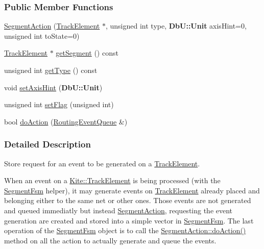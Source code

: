 \subsubsection*{Public Member Functions}
\begin{DoxyCompactItemize}
\item 
\hyperlink{classKite_1_1SegmentAction_acbeca58f8327b69a540628f299d5bd35}{Segment\-Action} (\hyperlink{classKite_1_1TrackElement}{Track\-Element} $\ast$, unsigned int type, {\bf Db\-U\-::\-Unit} axis\-Hint=0, unsigned int to\-State=0)
\item 
\hyperlink{classKite_1_1TrackElement}{Track\-Element} $\ast$ \hyperlink{classKite_1_1SegmentAction_ad2d369e354ca1f9ff118851da69c7efc}{get\-Segment} () const 
\item 
unsigned int \hyperlink{classKite_1_1SegmentAction_a8deb0c124963cedd374717099ff5bd22}{get\-Type} () const 
\item 
void \hyperlink{classKite_1_1SegmentAction_a8dc7cdf5f643a856fa5208bcfd1f8342}{set\-Axis\-Hint} ({\bf Db\-U\-::\-Unit})
\item 
unsigned int \hyperlink{classKite_1_1SegmentAction_a4e1f44319a9a0a413fe1413a87ec78bd}{set\-Flag} (unsigned int)
\item 
bool \hyperlink{classKite_1_1SegmentAction_a324f17f0f5a09b76344eb2e003695d74}{do\-Action} (\hyperlink{classKite_1_1RoutingEventQueue}{Routing\-Event\-Queue} \&)
\end{DoxyCompactItemize}


\subsubsection{Detailed Description}
Store request for an event to be generated on a \hyperlink{classKite_1_1TrackElement}{Track\-Element}. 

When an event on a \hyperlink{classKite_1_1TrackElement}{Kite\-::\-Track\-Element} is being processed (with the \hyperlink{classKite_1_1SegmentFsm}{Segment\-Fsm} helper), it may generate events on \hyperlink{classKite_1_1TrackElement}{Track\-Element} already placed and belonging either to the same net or other ones. Those events are not generated and queued immediatly but instead \hyperlink{classKite_1_1SegmentAction}{Segment\-Action}, requesting the event generation are created and stored into a simple vector in \hyperlink{classKite_1_1SegmentFsm}{Segment\-Fsm}. The last operation of the \hyperlink{classKite_1_1SegmentFsm}{Segment\-Fsm} object is to call the \hyperlink{classKite_1_1SegmentAction_a324f17f0f5a09b76344eb2e003695d74}{Segment\-Action\-::do\-Action()} method on all the action to actually generate and queue the events. 

